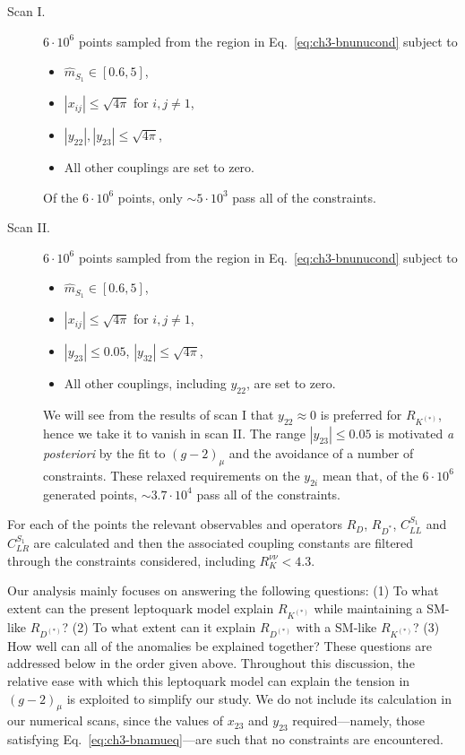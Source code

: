 \begin{description}%
\item [Scan I.] $6 \cdot 10^6$ points sampled from the region in
  Eq.~\eqref{eq:ch3-bnunucond} subject to
  \begin{itemize}
  \item $\hat{m}_{S_{1}} \in [0.6,5]$,
  \item $|x_{ij}| \leq \sqrt{4\pi}$ for ${i,j \neq 1}$,
  \item $|y_{22}|, |y_{23}| \leq \sqrt{4\pi}$,
  \item All other couplings are set to zero.
  \end{itemize}
  Of the $6 \cdot 10^6$ points, only $\sim 5 \cdot 10^3$ pass all of the
  constraints.
\item [Scan II.] $6 \cdot 10^6$ points sampled from the region in
  Eq.~\eqref{eq:ch3-bnunucond} subject to
  \begin{itemize}
  \item $\hat{m}_{S_{1}} \in [0.6,5]$,
  \item $|x_{ij}| \leq \sqrt{4\pi}$ for ${i,j \neq 1}$,
  \item $|y_{23}| \leq 0.05$, $|y_{32}| \leq \sqrt{4\pi}$,
  \item All other couplings, including $y_{22}$, are set to zero.
  \end{itemize}
  We will see from the results of scan I that $y_{22} \approx 0$ is preferred
  for $R_{K^{(*)}}$, hence we take it to vanish in scan II. The range $|y_{23}|
  \leq 0.05$ is motivated \textit{a posteriori} by the fit to $(g - 2)_\mu$ and
  the avoidance of a number of constraints. These relaxed requirements on the
  $y_{2i}$ mean that, of the $6 \cdot 10^6$ generated points, $\sim 3.7 \cdot
  10^4$ pass all of the constraints.
\end{description}
For each of the points the relevant observables and operators $R_D$, $R_{D^*}$,
$C_{LL}^{S_{1}}$ and $C_{LR}^{S_{1}}$ are calculated and then the associated coupling
constants are filtered through the constraints considered, including
$R_K^{\nu\nu} < 4.3$.

Our analysis mainly focuses on answering the following questions: (1) To what
extent can the present leptoquark model explain $R_{K^{(*)}}$ while maintaining
a SM-like $R_{D^{(*)}}$? (2) To what extent can it explain $R_{D^{(*)}}$ with a
SM-like $R_{K^{(*)}}$? (3) How well can all of the anomalies be explained
together? These questions are addressed below in the order given above.
Throughout this discussion, the relative ease with which this leptoquark model
can explain the tension in $(g-2)_\mu$ is exploited to simplify our study. We do
not include its calculation in our numerical scans, since the values of $x_{23}$
and $y_{23}$ required---namely, those satisfying Eq.~\eqref{eq:ch3-bnamueq}---are
such that no constraints are encountered.


